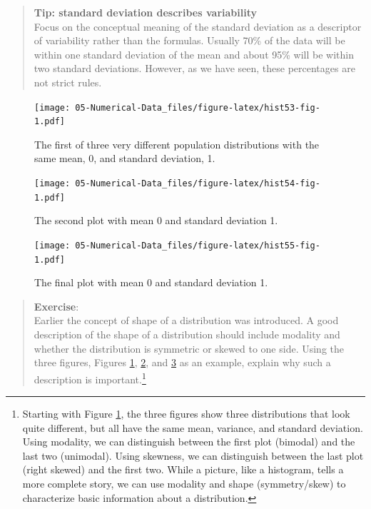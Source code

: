 \documentclass[
]{book}
\begin{document}
\begin{quote}
\textbf{Tip: standard deviation describes variability}\\
Focus on the conceptual meaning of the standard deviation as a descriptor of variability rather than the formulas. Usually 70\% of the data will be within one standard deviation of the mean and about 95\% will be within two standard deviations. However, as we have seen, these percentages are not strict rules.
\end{quote}

\begin{figure}
\centering
\texttt{[image: 05-Numerical-Data\_files/figure-latex/hist53-fig-1.pdf]}
\caption{\label{fig:hist53-fig}The first of three very different population distributions with the same mean, 0, and standard deviation, 1.}
\end{figure}

\begin{figure}
\centering
\texttt{[image: 05-Numerical-Data\_files/figure-latex/hist54-fig-1.pdf]}
\caption{\label{fig:hist54-fig}The second plot with mean 0 and standard deviation 1.}
\end{figure}

\begin{figure}
\centering
\texttt{[image: 05-Numerical-Data\_files/figure-latex/hist55-fig-1.pdf]}
\caption{\label{fig:hist55-fig}The final plot with mean 0 and standard deviation 1.}
\end{figure}

\begin{quote}
\textbf{Exercise}:\\
Earlier the concept of shape of a distribution was introduced. A good description of the shape of a distribution should include modality and whether the distribution is symmetric or skewed to one side. Using the three figures, Figures \ref{fig:hist53-fig}, \ref{fig:hist54-fig}, and \ref{fig:hist55-fig} as an example, explain why such a description is important.\footnote{Starting with Figure \ref{fig:hist53-fig}, the three figures show three distributions that look quite different, but all have the same mean, variance, and standard deviation. Using modality, we can distinguish between the first plot (bimodal) and the last two (unimodal). Using skewness, we can distinguish between the last plot (right skewed) and the first two. While a picture, like a histogram, tells a more complete story, we can use modality and shape (symmetry/skew) to characterize basic information about a distribution.}
\end{quote}
\end{document}

